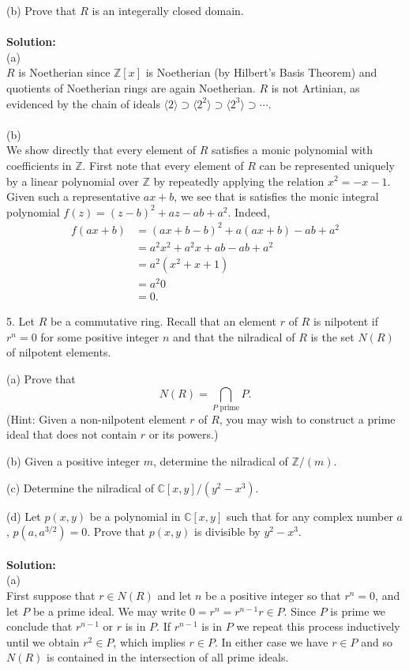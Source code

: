 \documentclass[11pt]{article}
\newcommand{\Z}{\mathbb{Z}}
\newcommand{\C}{\mathbb{C}}
\begin{document}
(b) Prove that $R$ is an integerally closed domain.\\
\\\textbf{Solution:}\\
(a)\\
$R$ is Noetherian since $\Z[x]$ is Noetherian (by Hilbert's Basis Theorem) and quotients of Noetherian rings are again Noetherian. 
$R$ is not Artinian, as evidenced by the chain of ideals $\langle 2 \rangle  \supset \langle 2^2\rangle \supset \langle 2^3\rangle \supset\cdots$. \\\\
(b)\\
We show directly that every element of $R$ satisfies a monic polynomial with coefficients in $\Z$. First note that every element of $R$ can be represented uniquely by a linear polynomial over $\Z$ by repeatedly applying the relation $x^2 = -x-1$. Given such a representative $ax + b$, we see that is satisfies the monic integral polynomial $f(z) = (z-b)^2 +az-ab+a^2$. Indeed,\begin{align*}
f(ax+b) & = (ax+b-b)^2  +a(ax+b) -ab+ a^2\\
& = a^2x^2  + a^2x + ab - ab+ a^2\\
& =  a^2(x^2+x+1)\\
& = a^2 0\\
& = 0.
\end{align*}

\newpage

5. Let $R$ be a commutative ring. Recall that an element $r$ of $R$ is nilpotent if $r^n = 0$ 
for some positive integer $n$ and that the nilradical of $R$ is the set $N(R)$ of nilpotent
elements.

(a) Prove that
\[
N(R) = \bigcap_{P\text{ prime}} P.
\]
(Hint: Given a non-nilpotent element $r$ of $R$, you may wish to construct a prime
ideal that does not contain $r$ or its powers.)

(b) Given a positive integer $m$, determine the nilradical of $\Z/(m)$.

(c) Determine the nilradical of $\C[x, y]/(y^2-x^3)$.

(d) Let $p(x, y)$ be a polynomial in $\C[x, y]$ such that for any complex number $a$,
 $p(a,a^{3/2}) = 0$.  Prove that $p(x, y)$ is divisible by $y^2-x^3$. \\\\
\textbf{Solution:}\\
(a)\\
First suppose that $r\in N(R)$ and let $n$ be a positive integer so that $r^n = 0$, and let $P$ be a prime ideal. We may write $0 = r^n = r^{n-1}r \in P$. Since $P$ is prime we conclude that $r^{n-1}$ or $r$ is in $P$. If $r^{n-1}$ is in $P$ we repeat this process inductively until we obtain $r^2\in P$, which implies $r\in P$. In either case we have $r\in P$ and so $N(R)$ is contained in the intersection of all prime ideals.
\end{document}
